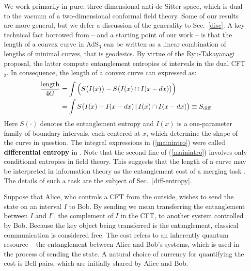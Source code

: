 \documentclass[12pt]{article}
\def\sdiff{S_{\rm diff}}
\begin{document}
We work primarily in pure, three-dimensional anti-de Sitter space, which is dual to the vacuum of a two-dimensional conformal field theory. Some of our results are more general, but we defer a discussion of the generality to Sec.~\ref{disc}. A key technical fact borrowed from \cite{holeography} -- and a starting point of our work -- is that the length of a convex curve in AdS$_3$ can be written as a linear combination of lengths of minimal curves, that is geodesics. By virtue of the Ryu-Takayanagi proposal, the latter compute entanglement entropies of intervals in the dual CFT$_2$. In consequence, the length of a convex curve can expressed as:
\begin{align}
\frac{\rm length}{4G} & = \int \Big(S\big(I(x)\big) - S\big(I(x) \cap I(x-dx)\big) \Big)
\nonumber \\ & =
\int S\big( I(x) - I(x-dx)\, |\,  I(x) \cap I(x-dx) \big) \equiv \sdiff
\label{mainintro}
\end{align}
Here $S(\cdot)$ denotes the entanglement entropy and $I(x)$ is a one-parameter family of boundary intervals, each centered at $x$, which determine the shape of the curve in question. The integral expressions in (\ref{mainintro}) were called {\bf differential entropy} in \cite{holeography}. Note that the second line of (\ref{mainintro}) involves only conditional entropies in field theory. This suggests that the length of a curve may be interpreted in information theory as the entanglement cost of a merging task \cite{naturepaper,horodecki2007quantum}. The details of such a task are the subject of Sec.~\ref{diff-entropy}.

Suppose that Alice, who controls a CFT from the outside, wishes to send the state on an interval $I$ to Bob. By sending we mean transferring the entanglement between $I$ and $I^c$, the complement of $I$ in the CFT, to another system controlled by Bob. Because the key object being transferred is the entanglement, classical communication is considered free. The cost refers to an inherently quantum resource -- the entanglement between Alice and Bob's systems, which is used in the process of sending the state. A natural choice of currency for quantifying the cost is Bell pairs, which are initially shared by Alice and Bob.
\end{document}
